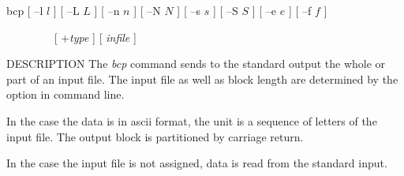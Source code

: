 
\begin{synopsis}
\item[bcp] [ --l $l$ ]  [ --L $L$ ]  [ --n $n$ ]  [ --N $N$ ]
           [ --s $s$ ]  [ --S $S$ ]  [ --e $e$ ]  [ --f $f$ ]
\item[\ ~~~~~~~] [ +{\em type} ] [ {\em infile} ] 
\end{synopsis}

\begin{qsection}{DESCRIPTION}
The {\em bcp} command sends to the standard output
the whole or part of an input file.
The input file as well as block length are determined by
the option in command line.
\par
In the case the data is in ascii format, the unit is
a sequence of letters of the input file.
The output block is partitioned by carriage return.
\par
In the case the input file is not assigned,
data is read from the standard input.
\end{qsection}

\begin{center}
\leavevmode
{}
\end{center}

\begin{options}
\end{options}

